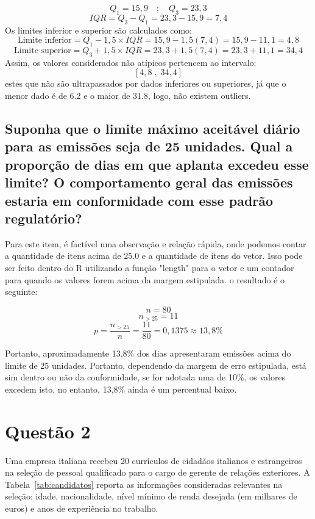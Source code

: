 \documentclass[12pt,a4paper]{article}
\begin{document}
\[Q_1 = 15{,}9 \quad ; \quad Q_3 = 23{,}3\]
\[IQR = Q_3 - Q_1 = 23{,}3 - 15{,}9 = 7{,}4\]
\noindent
Os limites inferior e superior são calculados como:
\[\text{Limite inferior} = Q_1 - 1{,}5 \times IQR = 15{,}9 - 1{,}5(7{,}4) = 15{,}9 - 11{,}1 = 4{,}8\]
\[\text{Limite superior} = Q_3 + 1{,}5 \times IQR = 23{,}3 + 1{,}5(7{,}4) = 23{,}3 + 11{,}1 = 34{,}4\]
\noindent
Assim, os valores considerados não atípicos pertencem ao intervalo:
\[[4{,}8 \; , \; 34{,}4]\] estes que não são ultrapassados por dados inferiores ou superiores, já que o menor dado é de 6.2 e o maior de 31.8, logo, não existem outliers.

\subsection{ Suponha que o limite máximo aceitável diário para as emissões seja de 25 unidades. 
 Qual a proporção de dias em que aplanta excedeu esse limite? O comportamento
 geral das emissões estaria em conformidade com esse padrão regulatório?}
 Para este item, é factível uma observação e relação rápida, onde podemos contar a quantidade de itens acima de 25.0 e a quantidade de itens do vetor. Isso pode ser feito dentro do R utilizando a função "length" para o vetor e um contador para quando os valores forem acima da margem estipulada. o resultado é o seguinte:

\[n = 80\]
\[n_{>25} = 11\]
\[p = \frac{n_{>25}}{n} = \frac{11}{80} = 0{,}1375 \approx 13{,}8\%\]

\noindent
Portanto, aproximadamente 13,8\% dos dias apresentaram emissões acima do limite de 25 unidades. Portanto, dependendo da margem de erro estipulada, está sim dentro ou não da conformidade, se for adotada uma de 10\%, os valores excedem isto, no entanto, 13,8\% ainda é um percentual baixo.


\section{Questão 2}

Uma empresa italiana recebeu 20 currículos de cidadãos italianos e estrangeiros na seleção de pessoal qualificado para o cargo de gerente de relações exteriores. 
A Tabela~\ref{tab:candidatos} reporta as informações consideradas relevantes na seleção: idade, nacionalidade, nível mínimo de renda desejada (em milhares de euros) e anos de experiência no trabalho. 
\end{document}
